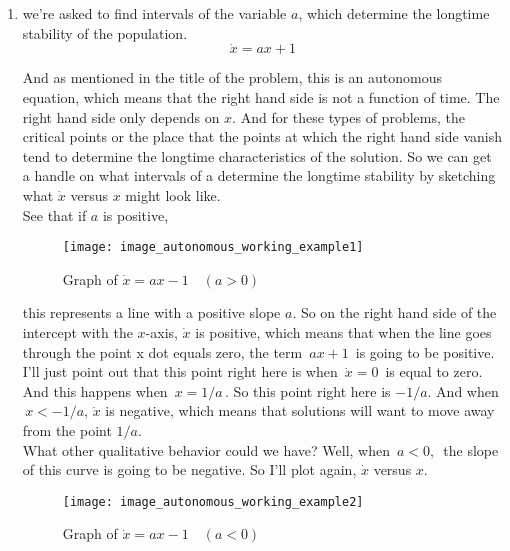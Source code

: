 \begin{enumerate}
\item we're asked to find intervals of the variable $a$,
  which determine the longtime stability of the population. \\

  \begin{equation*}
    \dot x = ax + 1
  \end{equation*}

  And as mentioned in the title of the problem,
  this is an autonomous equation, which means that the right hand
  side is not a function of time.
  The right hand side only depends on $x$.
  And for these types of problems, the critical points or the place
  that the points at which the right hand side vanish tend to determine
  the longtime characteristics of the solution.
  So we can get a handle on what intervals of a
  determine the longtime stability by sketching what
  $\dot x$  versus $x$ might look like. \\
  
  See that if $a$ is positive,

  \begin{figure}[ht!]
    \centering
      \texttt{[image: image\_autonomous\_working\_example1]}
    \caption{Graph of $\dot x = ax -1 \quad (a > 0)$}
  \end{figure}

  this represents a line with a positive slope $a$.
  So on the right hand side of the intercept with the $x$-axis,
  $\dot x$ is positive, which means that when the line goes
  through the point x dot equals zero, the term $\, ax + 1\,$ is going to be positive.
  I'll just point out that this point right here
  is when $\, \dot x = 0 \,$ is equal to zero.
  And this happens when $\, x = 1/a \,$.
  So this point right here is $-1/a$. 
  And when $\, x < -1 / a$,  $\dot x$ is negative, which means that solutions
  will want to move away from the point $1/a$. \\

  What other qualitative behavior could we have?
  Well, when $\, a < 0,\,$  the slope of this curve is going to be negative.
  So I'll plot again, $\dot x$ versus $x$.

  \begin{figure}[ht!]
    \centering
      \texttt{[image: image\_autonomous\_working\_example2]}
    \caption{Graph of $\dot x = ax -1 \quad (a < 0)$}
  \end{figure}
  

\end{enumerate}
